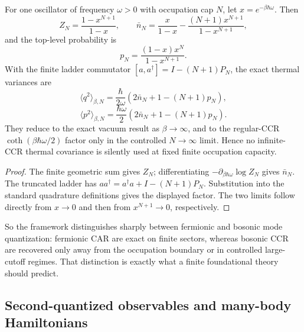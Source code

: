 \documentclass[12pt,a4paper]{article}
\begin{document}
\begin{proposition}
\label{p4:prop:v245-finite-thermal-boundary-correction}
For one oscillator of frequency \(\omega>0\) with occupation cap \(N\), let
\(x=e^{-\beta\hbar\omega}\).  Then
\[
 Z_N=\frac{1-x^{N+1}}{1-x},\qquad
 \bar n_N=\frac{x}{1-x}-\frac{(N+1)x^{N+1}}{1-x^{N+1}},
\]
and the top-level probability is
\[
 p_N=\frac{(1-x)x^N}{1-x^{N+1}}.
\]
With the finite ladder commutator
\([a,a^\dagger]=I-(N+1)P_N\), the exact thermal variances are
\[
 \boxed{\langle q^2\rangle_{\beta,N}
 =\frac{\hbar}{2\omega}
 \left(2\bar n_N+1-(N+1)p_N\right),}
\]
\[
 \boxed{\langle p^2\rangle_{\beta,N}
 =\frac{\hbar\omega}{2}
 \left(2\bar n_N+1-(N+1)p_N\right).}
\]
They reduce to the exact vacuum result as \(\beta\to\infty\), and to the
regular-CCR \(\coth(\beta\hbar\omega/2)\) factor only in the controlled
\(N\to\infty\) limit.  Hence no infinite-CCR thermal covariance is silently
used at fixed finite occupation capacity.
\end{proposition}

\begin{proof}
The finite geometric sum gives \(Z_N\); differentiating
\(-\partial_{\beta\hbar\omega}\log Z_N\) gives \(\bar n_N\).
The truncated ladder has
\(aa^\dagger=a^\dagger a+I-(N+1)P_N\).  Substitution into the standard
quadrature definitions gives the displayed factor.  The two limits follow
directly from \(x\to0\) and then from \(x^{N+1}\to0\), respectively.
\end{proof}


So the framework distinguishes sharply between fermionic and bosonic mode quantization:
fermionic CAR are exact on finite sectors, whereas bosonic CCR are recovered only away from the occupation boundary or in controlled large-cutoff regimes.
That distinction is exactly what a finite foundational theory should predict.



\subsection{Second-quantized observables and many-body Hamiltonians}
\label{p4:sec:part2-second-quantized}
\end{document}
